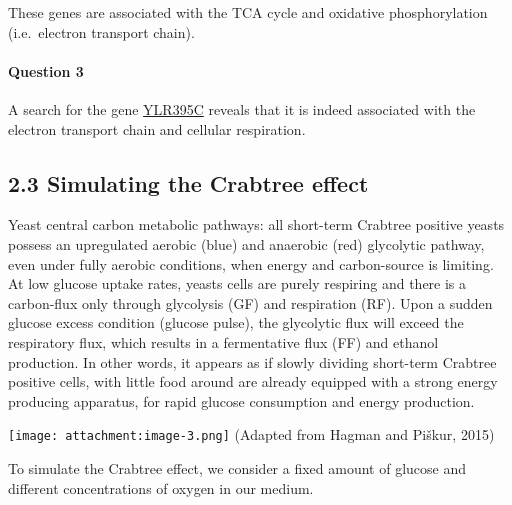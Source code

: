 \documentclass[11pt]{article}
\begin{document}
These genes are associated with the TCA cycle and oxidative
phosphorylation (i.e.~electron transport chain).

\hypertarget{question-3}{%
\paragraph{Question 3}\label{question-3}}

A search for the gene
\href{https://www.yeastgenome.org/locus/S000004387}{YLR395C} reveals
that it is indeed associated with the electron transport chain and
cellular respiration.

    \hypertarget{simulating-the-crabtree-effect}{%
\subsection{2.3 Simulating the Crabtree
effect}\label{simulating-the-crabtree-effect}}

    Yeast central carbon metabolic pathways: all short-term Crabtree
positive yeasts possess an upregulated aerobic (blue) and anaerobic
(red) glycolytic pathway, even under fully aerobic conditions, when
energy and carbon-source is limiting. At low glucose uptake rates,
yeasts cells are purely respiring and there is a carbon-flux only
through glycolysis (GF) and respiration (RF). Upon a sudden glucose
excess condition (glucose pulse), the glycolytic flux will exceed the
respiratory flux, which results in a fermentative flux (FF) and ethanol
production. In other words, it appears as if slowly dividing short-term
Crabtree positive cells, with little food around are already equipped
with a strong energy producing apparatus, for rapid glucose consumption
and energy production.

\texttt{[image: attachment:image-3.png]} (Adapted from Hagman and
Piškur, 2015)

    To simulate the Crabtree effect, we consider a fixed amount of glucose
and different concentrations of oxygen in our medium.
\end{document}
